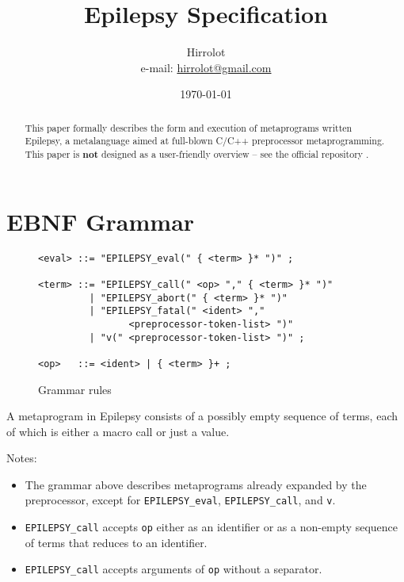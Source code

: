 \documentclass[12pt]{article}
\theoremstyle{break}
\begin{document}
\title{Epilepsy Specification}
\date{\today}
\author{Hirrolot \\ e-mail: \href{mailto:hirrolot@gmail.com}{hirrolot@gmail.com}}
\maketitle

\begin{abstract}
This paper formally describes the form and execution of metaprograms written
Epilepsy, a metalanguage aimed at full-blown C/C++ preprocessor metaprogramming. This paper
is \textbf{not} designed as a user-friendly overview -- see the official repository
\cite{Epilepsy}.
\end{abstract}

\tableofcontents

\newpage

\section{EBNF Grammar}

\begin{figure}[H]
    \caption{Grammar rules}

\begin{verbatim}
<eval> ::= "EPILEPSY_eval(" { <term> }* ")" ;

<term> ::= "EPILEPSY_call(" <op> "," { <term> }* ")"
         | "EPILEPSY_abort(" { <term> }* ")"
         | "EPILEPSY_fatal(" <ident> ","
                <preprocessor-token-list> ")"
         | "v(" <preprocessor-token-list> ")" ;

<op>   ::= <ident> | { <term> }+ ;
\end{verbatim}

\end{figure}

A metaprogram in Epilepsy consists of a possibly empty sequence of terms, each of which
is either a macro call or just a value.

Notes:

\begin{itemize}
    \item The grammar above describes metaprograms already expanded by the preprocessor,
    except for \texttt{EPILEPSY\_eval}, \texttt{EPILEPSY\_call}, and \texttt{v}.
    \item \texttt{EPILEPSY\_call} accepts \texttt{op} either as an identifier or as a non-empty
    sequence of terms that reduces to an identifier.
    \item \texttt{EPILEPSY\_call} accepts arguments of \texttt{op} without a separator.
\end{itemize}
\end{document}
